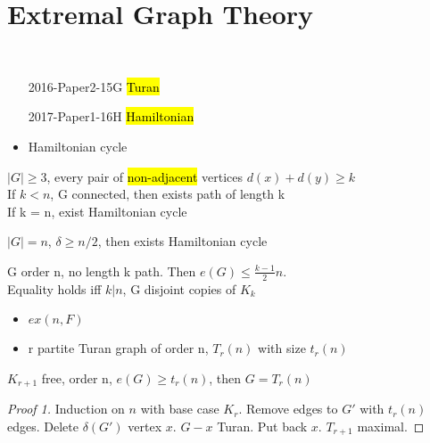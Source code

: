 \section{Extremal Graph Theory}\label{sec:extremal-graph-theory}

\begin{exam}
    \,
    \begin{enumerate}
        \item[2016-Paper2-15G] \hl{Turan}
        \item[2017-Paper1-16H] \hl{Hamiltonian}
    \end{enumerate}
\end{exam}

\begin{itemize}
    \item Hamiltonian cycle
\end{itemize}

\begin{thm}
    $|G| \geq 3$, every pair of \hl{non-adjacent} vertices $d(x) + d(y) \geq k$ \\
    If $k < n$, G connected, then exists path of length k \\
    If k = n, exist Hamiltonian cycle
\end{thm}

\begin{cor}[Dirac]
    $|G| = n$, $\delta \geq n/2$, then exists Hamiltonian cycle
\end{cor}

\begin{thm}
    G order n, no length k path.
    Then $e(G) \leq \frac{k-1}{2} n$. \\
    Equality holds iff $k|n$, G disjoint copies of $K_k$
\end{thm}

\begin{itemize}
    \item $ex(n, F)$
    \item r partite Turan graph of order n, $T_r(n)$ with size $t_r(n)$
\end{itemize}

\begin{thm}[Turan]
    $K_{r+1}$ free, order n, $e(G) \geq t_r(n)$, then $G = T_r(n)$
\end{thm}

\begin{proof}[Proof 1]
    Induction on $n$ with base case $K_r$.
    Remove edges to $G'$ with $t_r(n)$ edges.
    Delete $\delta(G')$ vertex $x$.
    $G - {x}$ Turan.
    Put back $x$.
    $T_{r+1}$ maximal.
\end{proof}

